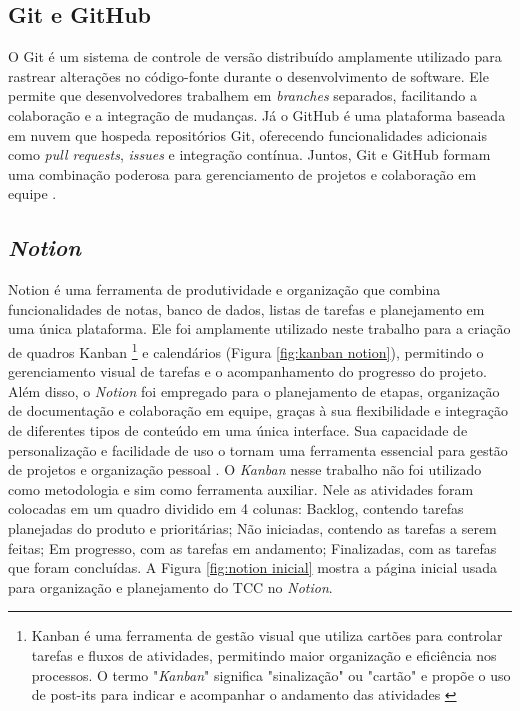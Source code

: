 {    \subsection{Git e GitHub}
    O Git é um sistema de controle de versão distribuído amplamente utilizado para rastrear alterações no código-fonte durante o desenvolvimento de software. Ele permite que desenvolvedores trabalhem em \textit{branches} separados, facilitando a colaboração e a integração de mudanças. Já o GitHub é uma plataforma baseada em nuvem que hospeda repositórios Git, oferecendo funcionalidades adicionais como \textit{pull requests}, \textit{issues} e integração contínua. Juntos, Git e GitHub formam uma combinação poderosa para gerenciamento de projetos e colaboração em equipe \citep{git,github}.
    
    \subsection{\textit{Notion}}
     Notion é uma ferramenta de produtividade e organização que combina funcionalidades de notas, banco de dados, listas de tarefas e planejamento em uma única plataforma. Ele foi amplamente utilizado neste trabalho para a criação de quadros Kanban \footnote{Kanban é uma ferramenta de gestão visual que utiliza cartões para controlar tarefas e fluxos de atividades, permitindo maior organização e eficiência nos processos. O termo "\textit{Kanban}" significa "sinalização" ou "cartão" e propõe o uso de post-its para indicar e acompanhar o andamento das atividades \citep{aguiar2007compreendendo}} e calendários (Figura \ref{fig:kanban notion}), permitindo o gerenciamento visual de tarefas e o acompanhamento do progresso do projeto. Além disso, o \textit{Notion} foi empregado para o planejamento de etapas, organização de documentação e colaboração em equipe, graças à sua flexibilidade e integração de diferentes tipos de conteúdo em uma única interface. Sua capacidade de personalização e facilidade de uso o tornam uma ferramenta essencial para gestão de projetos e organização pessoal \citep{notion}.
     O \textit{Kanban} nesse trabalho não foi utilizado como metodologia e sim como ferramenta auxiliar. Nele as atividades foram colocadas em um quadro dividido em 4 colunas: Backlog, contendo tarefas planejadas do produto e prioritárias; Não iniciadas, contendo as tarefas a serem feitas; Em progresso, com as tarefas em andamento; Finalizadas, com as tarefas que foram concluídas.
     A Figura \ref{fig:notion inicial} mostra a página inicial usada para organização e planejamento do TCC no \textit{Notion}.
    
}
